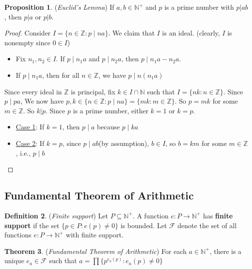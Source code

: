 \documentclass[14pt]{article}
\theoremstyle{definition}
\newtheorem{definition}{Definition}[subsection]
\newtheorem{proposition}[definition]{Proposition}
\newtheorem{theorem}[definition]{Theorem}
\begin{document}
\begin{proposition}
    (\textit{Euclid's Lemma}) If $a,b\in\mathbb{N}^+$ and $p$ is a prime number with $p|ab$, then $p|a$ or $p|b$.
\end{proposition}
\begin{proof}
    Consider $I=\{n\in\mathbb{Z}\colon p\mid na\}$.
    We claim that $I$ is an ideal. (clearly, $I$ is nonempty since $0\in I$)
    \begin{itemize}
        \item Fix $n_1, n_2\in I$. If $ p\mid n_1a$ and $ p\mid n_2a$, then $ p\mid n_1a-n_2a$.
        \item If $ p\mid n_1a$, then for all $n\in \mathbb{Z}$, we have $p\mid n(n_1a)$
    \end{itemize}
    Since every ideal in $\mathbb{Z}$ is principal, fix $k\in I \cap \mathbb{N}$ such that $I=\{nk\colon n\in \mathbb{Z}\}$. Since $p\mid pa$, We now have $p,k\in\{n\in\mathbb{Z}\colon p\mid na\}= \{mk\colon m\in \mathbb{Z}\}$. So $p=mk$ for some $m\in \mathbb{Z}$. So $k|p$. Since $p$ is a prime number, either $k=1$ or $k=p$.
    \begin{itemize}
        \item \underline{Case 1}: If $k=1$, then $p\mid a$ because $p\mid ka$
        \item \underline{Case 2}: If $k=p$, since $p\mid ab$(by assumption), $b\in I$, so $b=km$ for some $m\in \mathbb{Z}$, i.e., $p\mid b$
    \end{itemize}
\end{proof}

\vspace{5mm} %

\subsection{Fundamental Theorem of Arithmetic}
\begin{definition}
  (\textit{Finite support})  Let $P\subseteq \mathbb{N}^+$. A function $e\colon P\rightarrow \mathbb{N}^+$ has \textbf{finite support} if the set $\{p\in P\colon e(p)\not=0\}$ is bounded. Let $\mathcal{F} $ denote the set of all functions  $e\colon P\rightarrow \mathbb{N}^+$ with finite support.
\end{definition}

\vspace{2mm} %

\begin{theorem}
(\textit{Fundamental Theorem of Arithmetic}) For each $a\in \mathbb{N}^+$, there is a unique $e_a\in \mathcal{F}$ such that $a=\prod \{p^{e_a(p)}\colon e_a(p)\not=0\}$
\end{theorem}
\end{document}

